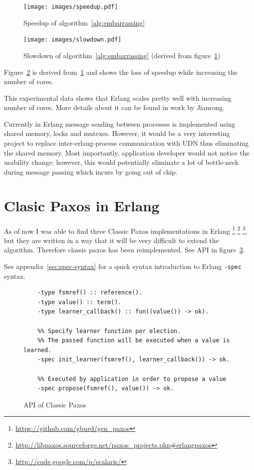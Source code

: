 \documentclass[english,11pt]{l4proj}
\begin{document}
\begin{figure}
    \centering
    \texttt{[image: images/speedup.pdf]}
    \caption{Speedup of algorithm~\ref{alg:embarrassing}}
    \label{fig:parallel_speedup}
\end{figure}

\begin{figure}
    \centering
    \texttt{[image: images/slowdown.pdf]}
    \caption{Slowdown of algorithm~\ref{alg:embarrassing} (derived
    from figure~\ref{fig:parallel_speedup})}
    \label{fig:parallel_slowdown}
\end{figure}

Figure~\ref{fig:parallel_slowdown} is derived from~\ref{fig:parallel_speedup}
and shows the loss of speedup while increasing the number of cores.

This experimental data shows that Erlang scales pretty well with increasing
number of cores. More details about it can be found in work by
Jianrong\cite{erlang-manycore-scalability}.

Currently in Erlang message sending between processes is implemented using
shared memory, locks and mutexes. However, it would be a very interesting
project to replace inter-erlang-process communication with UDN thus eliminating
the shared memory. Most importantly, application developer would not notice the
usability change; however, this would potentially eliminate a lot of bottle-neck
during message passing which incurs by going out of chip.

\section{Clasic Paxos in Erlang}
\label{sec:paxos-api}

As of now I was able to find three Classic Paxos implementations in Erlang
\footnote{\url{https://github.com/gburd/gen\_paxos}}
\footnote{\url{http://libpaxos.sourceforge.net/paxos\_projects.php\#erlangpaxos}}
\footnote{\url{http://code.google.com/p/scalaris/}}, but they are written in a
way that it will be very difficult to extend the algorithm. Therefore classic
paxos has been reimplemented. See API in figure~\ref{fig:paxos-api}.

See appendix~\ref{sec:spec-syntax} for a quick syntax introduction to Erlang
{\tt -spec} syntax.

\begin{figure}
    \begin{verbatim}
    -type fsmref() :: reference().
    -type value() :: term().
    -type learner_callback() :: fun((value()) -> ok).

    %% Specify learner function per election.
    %% The passed function will be executed when a value is learned.
    -spec init_learner(fsmref(), learner_callback()) -> ok.

    %% Executed by application in order to propose a value
    -spec propose(fsmref(), value()) -> ok.
    \end{verbatim}
    \caption{API of Classic Paxos\cite{epaxos}}
    \label{fig:paxos-api}
\end{figure}
\end{document}
